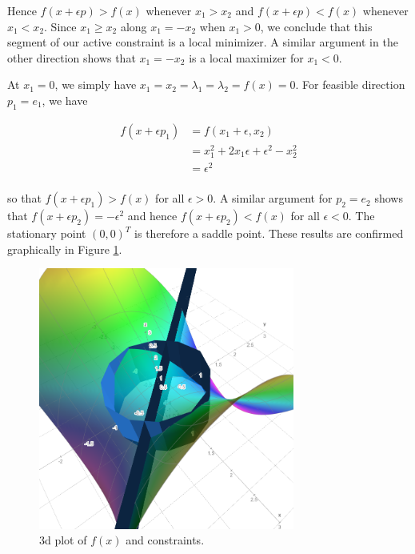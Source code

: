 \begin{solution}
    Hence $f(x + \epsilon p) > f(x)$ whenever $x_1 > x_2$ and $f(x + \epsilon p) < f(x)$ whenever $x_1 < x_2$. Since
    $x_1 \ge x_2$ along $x_1 = -x_2$ when $x_1 > 0$, we conclude that this segment of our active constraint is a
    local minimizer. A similar argument in the other direction shows that $x_1 = -x_2$ is a local maximizer for 
    $x_1 < 0$.

    At $x_1 = 0$, we simply have $x_1 = x_2 = \lambda_1 = \lambda_2 = f(x) = 0$. For feasible direction $p_1 = e_1$, we
    have


    \begin{align*}
        f(x + \epsilon p_1) &= f(x_1 + \epsilon, x_2) \\
                            &= x_1^2 + 2x_1 \epsilon + \epsilon^2 - x_2^2 \\
                            &= \epsilon^2 \\
    \end{align*}

    so that $f(x + \epsilon p_1) > f(x)$ for all $\epsilon > 0$. A similar argument for $p_2 = e_2$ shows that 
    $f(x + \epsilon p_2) = -\epsilon^2$ and hence $f(x + \epsilon p_2) < f(x)$ for all $\epsilon < 0$. The stationary 
    point $(0, 0)^T$ is therefore a saddle point. These results are confirmed graphically in Figure 
    \ref{fig:problem_4b}.

    \begin{figure}[h]
        \centering
        \includegraphics*[width=0.75\textwidth]{problem_4b.png}
        \caption{3d plot of $f(x)$ and constraints.}
        \label{fig:problem_4b}
    \end{figure}


\end{solution}
